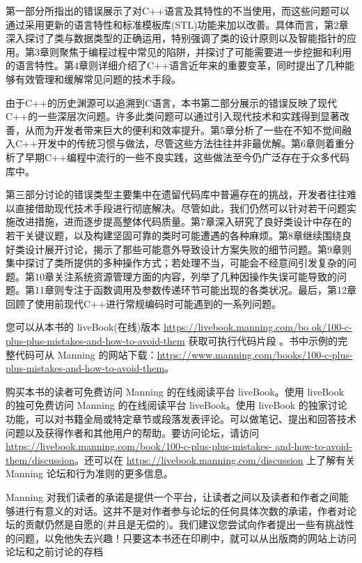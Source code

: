 
第一部分所指出的错误展示了对C++语言及其特性的不当使用，而这些问题可以通过采用更新的语言特性和标准模板库(STL)功能来加以改善。具体而言，第2章深入探讨了类与数据类型的正确运用，特别强调了类的设计原则以及智能指针的应用。第3章则聚焦于编程过程中常见的陷阱，并探讨了可能需要进一步挖掘和利用的语言特性。第4章则详细介绍了C++语言近年来的重要变革，同时提出了几种能够有效管理和缓解常见问题的技术手段。

由于C++的历史渊源可以追溯到C语言，本书第二部分展示的错误反映了现代C++的一些深层次问题。许多此类问题可以通过引入现代技术和实践得到显著改善，从而为开发者带来巨大的便利和效率提升。第5章分析了一些在不知不觉间融入C++开发中的传统习惯与做法，尽管这些方法往往并非最优解。第6章则着重分析了早期C++编程中流行的一些不良实践，这些做法至今仍广泛存在于众多代码库中。

第三部分讨论的错误类型主要集中在遗留代码库中普遍存在的挑战，开发者往往难以直接借助现代技术手段进行彻底解决。尽管如此，我们仍然可以针对若干问题实施改进措施，进而逐步提高整体代码质量。第7章深入研究了良好类设计中存在的若干关键议题，以及构建坚固可靠的类时可能遭遇的各种麻烦。第8章继续围绕良好类设计展开讨论，揭示了那些可能意外导致设计方案失败的细节问题。第9章则集中探讨了类所提供的多种操作方式；若处理不当，可能会不经意间引发复杂的问题。第10章关注系统资源管理方面的内容，列举了几种因操作失误可能导致的问题。第11章则专注于函数调用及参数传递环节可能出现的各类状况。最后，第12章回顾了使用前现代C++进行常规编码时可能遇到的一系列问题。


您可以从本书的 liveBook(在线)版本 \url{https://livebook.manning.com/bo
ok/100-c-plus-plus-mistakes-and-how-to-avoid-them} 获取可执行代码片段
。书中示例的完整代码可从 Manning 的网站下载：\url{https://www.manning.com/books/100-c-plus-plus-mistakes-and-how-to-avoid-them}。


购买本书的读者可免费访问 Manning 的在线阅读平台 liveBook。使用 liveBook 的独可免费访问 Manning 的在线阅读平台 liveBook。使用 liveBook 的独家讨论功能，可以对书籍全局或特定章节或段落发表评论。可以做笔记、提出和回答技术问题以及获得作者和其他用户的帮助。要访问论坛，请访问 \url{https://livebook.manning.com/book/100-c-plus-plus-mistakes- and-how-to-avoid-them/discussion}。还可以在 \url{https://livebook.manning.com/discussion} 上了解有关 Manning 论坛和行为准则的更多信息。

Manning 对我们读者的承诺是提供一个平台，让读者之间以及读者和作者之间能够进行有意义的对话。这并不是对作者参与论坛的任何具体次数的承诺，作者对论坛的贡献仍然是自愿的(并且是无偿的)。我们建议您尝试向作者提出一些有挑战性的问题，以免他失去兴趣！只要这本书还在印刷中，就可以从出版商的网站上访问论坛和之前讨论的存档
